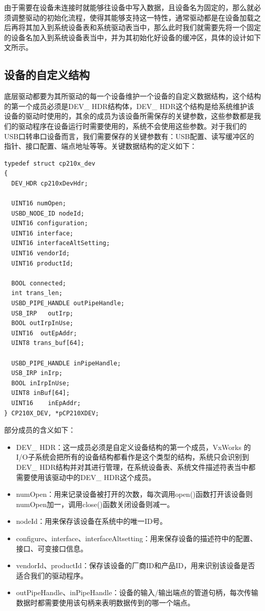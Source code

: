 	由于需要在设备未连接时就能够往设备中写入数据，且设备名为固定的，那么就必须调整驱动的初始化流程，使得其能够支持这一特性，通常驱动都是在设备加载之后再将其加入到系统设备表和系统驱动表当中，那么此时我们就需要先将一个固定的设备名加入到系统设备表当中，并为其初始化好设备的缓冲区，具体的设计如下文所示。



\subsection{设备的自定义结构}
	底层驱动都要为其所驱动的每一个设备维护一个设备的自定义数据结构，这个结构的第一个成员必须是DEV\_ HDR结构体，DEV\_ HDR这个结构是给系统维护该设备的驱动时使用的，其余的成员为该设备所需保存的关键参数，这些参数都是我们的驱动程序在设备运行时需要使用的，系统不会使用这些参数。对于我们的USB口转串口设备而言，我们需要保存的关键参数有：USB配置、读写缓冲区的指针、接口配置、端点地址等等。关键数据结构的定义如下： 
	
\lstset{language=C}
\begin{lstlisting}
typedef struct cp210x_dev
{
  DEV_HDR cp210xDevHdr; 
  
  UINT16 numOpen;
  USBD_NODE_ID nodeId;
  UINT16 configuration;	
  UINT16 interface; 
  UINT16 interfaceAltSetting;
  UINT16 vendorId;
  UINT16 productId;

  BOOL connected;  
  int trans_len;
  USBD_PIPE_HANDLE outPipeHandle; 
  USB_IRP	outIrp; 
  BOOL outIrpInUse; 
  UINT16  outEpAddr;
  UINT8 trans_buf[64];

  USBD_PIPE_HANDLE inPipeHandle;
  USB_IRP inIrp;
  BOOL inIrpInUse;
  UINT8 inBuf[64];
  UINT16 	inEpAddr;
} CP210X_DEV, *pCP210XDEV;
\end{lstlisting}
\noindent 部分成员的含义如下：

\begin{itemize}
\item DEV\_ HDR：这一成员必须是自定义设备结构的第一个成员，VxWorks 的I/O子系统会把所有的设备结构都看作是这个类型的结构，系统只会识别到DEV\_ HDR结构并对其进行管理，在系统设备表、系统文件描述符表当中都需要使用该驱动中的DEV\_ HDR这个成员。
\item numOpen：用来记录设备被打开的次数，每次调用open()函数打开该设备则numOpen加一，调用close()函数关闭设备则减一。
\item nodeId：用来保存该设备在系统中的唯一ID号。
\item configure、interface、interfaceAltsetting：用来保存设备的描述符中的配置、接口、可变接口信息。
\item vendorId、productId：保存该设备的厂商ID和产品ID，用来识别该设备是否适合我们的驱动程序。
\item outPipeHandle、inPipeHandle：设备的输入/输出端点的管道句柄，每次传输数据时都需要使用该句柄来表明数据传到的哪一个端点。
\end{itemize}







